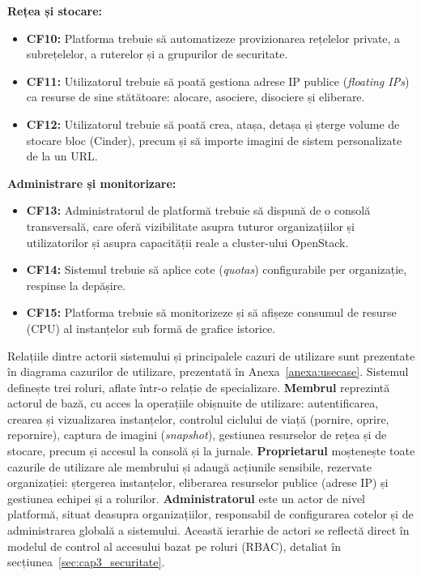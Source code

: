 \textbf{Rețea și stocare:}
\begin{itemize}
    \item \textbf{CF10:} Platforma trebuie să automatizeze provizionarea rețelelor private, a subrețelelor, a ruterelor și a grupurilor de securitate.
    \item \textbf{CF11:} Utilizatorul trebuie să poată gestiona adrese IP publice (\textit{floating IPs}) ca resurse de sine stătătoare: alocare, asociere, disociere și eliberare.
    \item \textbf{CF12:} Utilizatorul trebuie să poată crea, atașa, detașa și șterge volume de stocare bloc (Cinder), precum și să importe imagini de sistem personalizate de la un URL.
\end{itemize}

\textbf{Administrare și monitorizare:}
\begin{itemize}
    \item \textbf{CF13:} Administratorul de platformă trebuie să dispună de o consolă transversală, care oferă vizibilitate asupra tuturor organizațiilor și utilizatorilor și asupra capacității reale a cluster-ului OpenStack.
    \item \textbf{CF14:} Sistemul trebuie să aplice cote (\textit{quotas}) configurabile per organizație, respinse la depășire.
    \item \textbf{CF15:} Platforma trebuie să monitorizeze și să afișeze consumul de resurse (CPU) al instanțelor sub formă de grafice istorice.
\end{itemize}

Relațiile dintre actorii sistemului și principalele cazuri de utilizare sunt prezentate în diagrama cazurilor de utilizare, prezentată în Anexa~\ref{anexa:usecase}. Sistemul definește trei roluri, aflate într-o relație de specializare. \textbf{Membrul} reprezintă actorul de bază, cu acces la operațiile obișnuite de utilizare: autentificarea, crearea și vizualizarea instanțelor, controlul ciclului de viață (pornire, oprire, repornire), captura de imagini (\textit{snapshot}), gestiunea resurselor de rețea și de stocare, precum și accesul la consolă și la jurnale. \textbf{Proprietarul} moștenește toate cazurile de utilizare ale membrului și adaugă acțiunile sensibile, rezervate organizației: ștergerea instanțelor, eliberarea resurselor publice (adrese IP) și gestiunea echipei și a rolurilor. \textbf{Administratorul} este un actor de nivel platformă, situat deasupra organizațiilor, responsabil de configurarea cotelor și de administrarea globală a sistemului. Această ierarhie de actori se reflectă direct în modelul de control al accesului bazat pe roluri (RBAC), detaliat în secțiunea~\ref{sec:cap3_securitate}.

